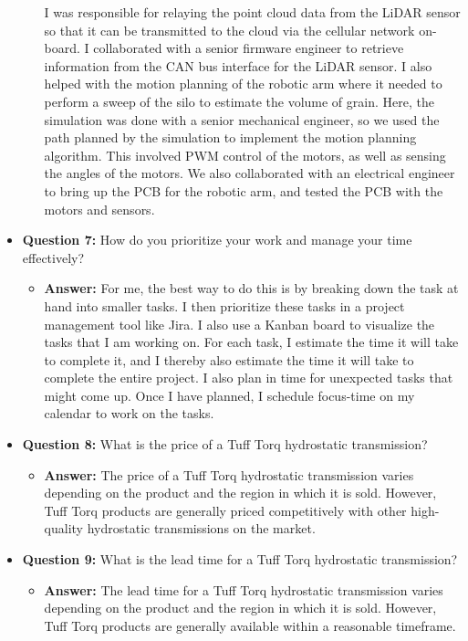\documentclass{article}
\begin{document}
\begin{itemize}
\begin{itemize}
        I was responsible for
        relaying the point cloud data from the LiDAR sensor
        so that it can be transmitted to the cloud via the cellular network on-board.
        I collaborated with a senior firmware engineer to
        retrieve information from the CAN bus interface for the LiDAR sensor.
        I also helped with the motion planning of the robotic arm where it
        needed to perform a sweep of the silo to estimate the volume of grain. Here,
        the simulation was done with a senior mechanical engineer, so we
        used the path planned by the simulation to implement the motion
        planning algorithm. This involved PWM control of the motors, as well
        as sensing the angles of the motors. We also collaborated with an
        electrical engineer to bring up the PCB for the robotic arm, and
        tested the PCB with the motors and sensors.\\
    \end{itemize}
    
    \item \textbf{Question 7:} How do you prioritize your work and manage your time effectively?
    \begin{itemize}
        \item \textbf{Answer:} For me, the best way to do this is by breaking down
        the task at hand into smaller tasks. I then prioritize these tasks
        in a project management tool like Jira. I also use a Kanban board
        to visualize the tasks that I am working on. For each task,
        I estimate the time it will take to complete it, and I thereby also
        estimate the time it will take to complete the entire project. I also
        plan in time for unexpected tasks that might come up. Once I have
        planned, I schedule focus-time on my calendar to work on the tasks.
    \end{itemize}
    
    \item \textbf{Question 8:} What is the price of a Tuff Torq hydrostatic transmission?
    \begin{itemize}
        \item \textbf{Answer:} The price of a Tuff Torq hydrostatic transmission varies depending on the product and the region in which it is sold. However, Tuff Torq products are generally priced competitively with other high-quality hydrostatic transmissions on the market.
    \end{itemize}
    
    \item \textbf{Question 9:} What is the lead time for a Tuff Torq hydrostatic transmission?
    \begin{itemize}
        \item \textbf{Answer:} The lead time for a Tuff Torq hydrostatic transmission varies depending on the product and the region in which it is sold. However, Tuff Torq products are generally available within a reasonable timeframe.
    \end{itemize}
    

\end{itemize}
\end{document}
